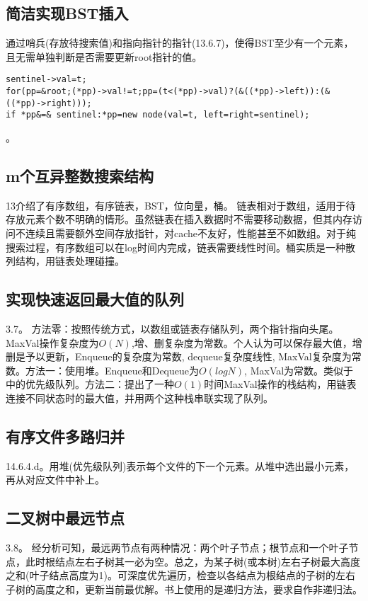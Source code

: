 \subsection{简洁实现BST插入}
通过哨兵(存放待搜索值)和指向指针的指针(\cite{pp}13.6.7)，使得BST至少有一个元素，且无需单独判断是否需要更新root指针的值。
\begin{verbatim}
sentinel->val=t;
for(pp=&root;(*pp)->val!=t;pp=(t<(*pp)->val)?(&((*pp)->left)):(&((*pp)->right)));
if *pp&=& sentinel:*pp=new node(val=t, left=right=sentinel);
\end{verbatim}
\label{problem:BSTInsert}。


\subsection{m个互异整数搜索结构}
\cite{pp}13介绍了有序数组，有序链表，BST，位向量，桶。
链表相对于数组，适用于待存放元素个数不明确的情形。虽然链表在插入数据时不需要移动数据，但其内存访问不连续且需要额外空间存放指针，对cache不友好，性能甚至不如数组。对于纯搜索过程，有序数组可以在log时间内完成，链表需要线性时间。桶实质是一种散列结构，用链表处理碰撞。


\subsection{实现快速返回最大值的队列}
\cite{bop}3.7。
方法零：按照传统方式，以数组或链表存储队列，两个指针指向头尾。MaxVal操作复杂度为$O(N)$,增、删复杂度为常数。个人认为可以保存最大值，增删是予以更新，Enqueue的复杂度为常数, dequeue复杂度线性, MaxVal复杂度为常数。方法一：使用堆。Enqueue和Dequeue为$O(logN)$, MaxVal为常数。类似于\cite{ita}中的优先级队列。方法二：\cite{bop}提出了一种$O(1)$时间MaxVal操作的栈结构，用链表连接不同状态时的最大值，并用两个这种栈串联实现了队列。


\subsection{有序文件多路归并}
\cite{pp}14.6.4.d。用堆(优先级队列)表示每个文件的下一个元素。从堆中选出最小元素，再从对应文件中补上。

\subsection{二叉树中最远节点}
\cite{bop}3.8。
经分析可知，最远两节点有两种情况：两个叶子节点；根节点和一个叶子节点，此时根结点左右子树其一必为空。总之，为某子树(或本树)左右子树最大高度之和(叶子结点高度为1)。可深度优先遍历，检查以各结点为根结点的子树的左右子树的高度之和，更新当前最优解。书上使用的是递归方法，要求自作非递归法。

